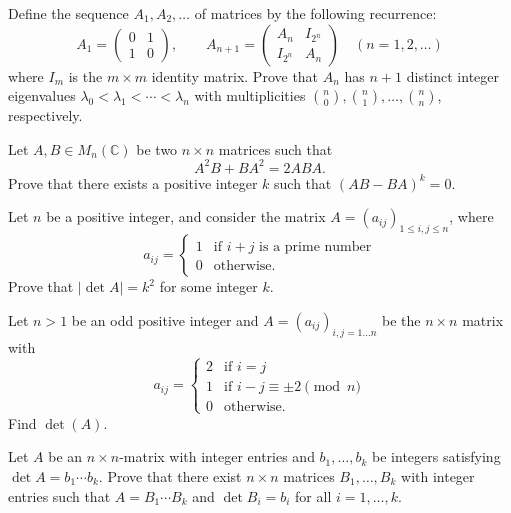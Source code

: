 \documentclass[12pt]{article}
\begin{document}
\begin{problem}
Define the sequence $A_1,A_2,\dots$ of matrices by the following recurrence:
\[
A_1 = \begin{pmatrix}0 & 1\\ 1 & 0\end{pmatrix}, \qquad A_{n+1} = \begin{pmatrix} A_n & I_{2^n}\\ I_{2^n} & A_n\end{pmatrix} \quad (n=1,2,\dots)
\]
where $I_m$ is the $m\times m$ identity matrix. Prove that $A_n$ has $n+1$ distinct integer eigenvalues $\lambda_0<\lambda_1<\cdots<\lambda_n$ with multiplicities $\binom{n}{0},\binom{n}{1},\dots,\binom{n}{n}$, respectively.
\end{problem}

\begin{problem}
Let $A,B\in M_n(\mathbb{C})$ be two $n\times n$ matrices such that
\[
A^2B+BA^2 = 2ABA.
\]
Prove that there exists a positive integer $k$ such that $(AB-BA)^k=0$.
\end{problem}

\begin{problem}
Let $n$ be a positive integer, and consider the matrix $A=(a_{ij})_{1\le i,j\le n}$, where
\[
a_{ij} = \begin{cases} 1 & \text{if } i+j \text{ is a prime number}\\ 0 & \text{otherwise.}\end{cases}
\]
Prove that $|\det A| = k^2$ for some integer $k$.
\end{problem}

\begin{problem}
Let $n>1$ be an odd positive integer and $A=(a_{ij})_{i,j=1\dots n}$ be the $n\times n$ matrix with
\[
a_{ij} = \begin{cases} 2 & \text{if } i=j\\ 1 & \text{if } i-j\equiv \pm 2 \pmod n\\ 0 & \text{otherwise.}\end{cases}
\]
Find $\det(A)$.
\end{problem}

\begin{problem}
Let $A$ be an $n\times n$-matrix with integer entries and $b_1,\dots,b_k$ be integers satisfying $\det A = b_1\cdots b_k$. Prove that there exist $n\times n$ matrices $B_1,\dots,B_k$ with integer entries such that $A=B_1\cdots B_k$ and $\det B_i = b_i$ for all $i=1,\dots,k$.
\end{problem}
\end{document}
